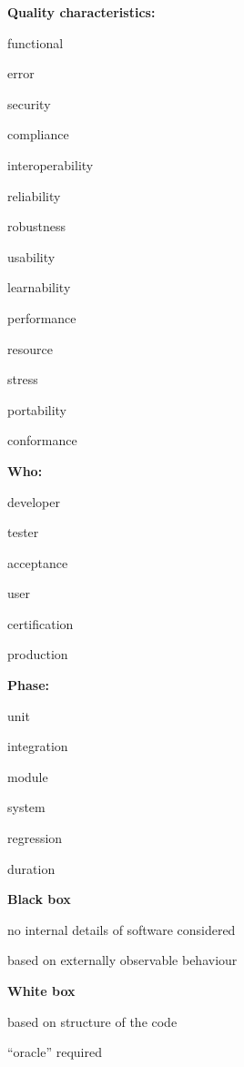 \textbf{Quality characteristics:}
\begin{multicols}{2}
\begin{itemize*}
	\item functional
	\item error
	\item security
	\item compliance
	\item interoperability
	\item reliability
	\item robustness
	\item usability
	\item learnability
	\item performance
	\item resource
	\item stress
	\item portability
	\item conformance
\end{itemize*}
\end{multicols}

\textbf{Who:}
\begin{itemize*}
	\item developer
	\item tester
	\item acceptance
	\item user
	\item certification
	\item production
\end{itemize*}

\textbf{Phase:}
\begin{itemize*}
	\item unit
	\item integration
	\item module
	\item system
	\item regression
	\item duration
\end{itemize*}

\textbf{Black box}
\begin{itemize*}
	\item no internal details of software considered
	\item based on externally observable behaviour
\end{itemize*}

\textbf{White box}
\begin{itemize*}
	\item based on structure of the code
	\item “oracle” required
\end{itemize*}

